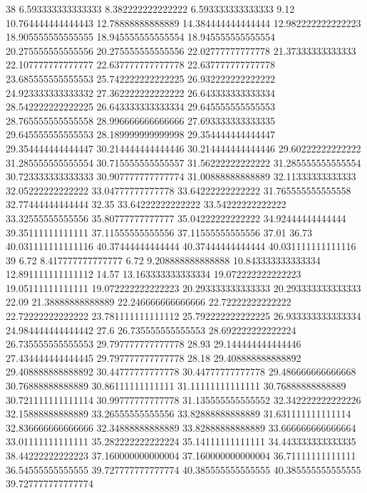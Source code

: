 38 6.593333333333333 8.382222222222222 6.593333333333333 9.12 10.764444444444443 12.78888888888889 14.384444444444444 12.982222222222223 18.905555555555555 18.945555555555554 18.945555555555554 20.275555555555556 20.275555555555556 22.02777777777778 21.37333333333333 22.107777777777777 22.637777777777778 22.637777777777778 23.685555555555553 25.742222222222225 26.932222222222222 24.923333333333332 27.362222222222222 26.643333333333334 28.542222222222225 26.643333333333334 29.645555555555553 28.765555555555558 28.996666666666666 27.693333333333335 29.645555555555553 28.189999999999998 29.354444444444447 29.354444444444447 30.214444444444446 30.214444444444446 29.60222222222222 31.285555555555554 30.715555555555557 31.56222222222222 31.285555555555554 30.723333333333333 30.907777777777774 31.00888888888889 32.11333333333333 32.05222222222222 33.04777777777778 33.64222222222222 31.765555555555558 32.77444444444444 32.35 33.64222222222222 33.54222222222222 33.32555555555556 35.80777777777777 35.04222222222222 34.92444444444444 39.35111111111111 37.11555555555556 37.11555555555556 37.01 36.73 40.031111111111116 40.37444444444444 40.37444444444444 40.031111111111116
39 6.72 8.417777777777777 6.72 9.208888888888888 10.843333333333334 12.891111111111112 14.57 13.163333333333334 19.072222222222223 19.05111111111111 19.072222222222223 20.293333333333333 20.293333333333333 22.09 21.38888888888889 22.246666666666666 22.72222222222222 22.72222222222222 23.781111111111112 25.792222222222225 26.933333333333334 24.984444444444442 27.6 26.735555555555553 28.692222222222224 26.735555555555553 29.797777777777778 28.93 29.144444444444446 27.434444444444445 29.797777777777778 28.18 29.408888888888892 29.408888888888892 30.44777777777778 30.44777777777778 29.486666666666668 30.76888888888889 30.86111111111111 31.11111111111111 30.76888888888889 30.721111111111114 30.99777777777778 31.135555555555552 32.342222222222226 32.15888888888889 33.26555555555556 33.82888888888889 31.631111111111114 32.836666666666666 32.34888888888889 33.82888888888889 33.666666666666664 33.01111111111111 35.282222222222224 35.14111111111111 34.443333333333335 38.44222222222223 37.160000000000004 37.160000000000004 36.71111111111111 36.54555555555555 39.727777777777774 40.385555555555555 40.385555555555555 39.727777777777774
